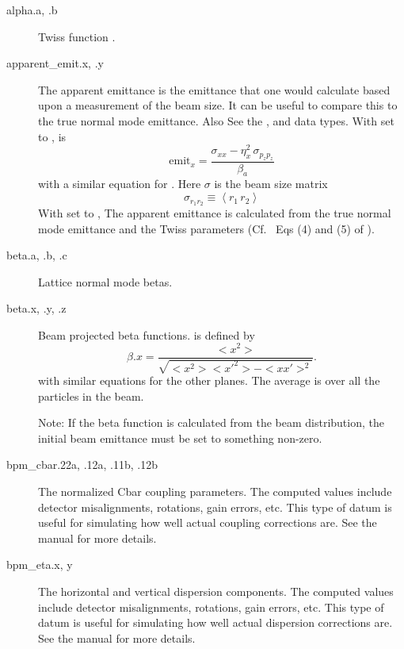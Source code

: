   \begin{description}

  \item[alpha.a, .b] \Newline
Twiss function .

  \item[apparent_emit.x, .y] \Newline
The apparent emittance is the emittance that one would calculate based
upon a measurement of the beam size\cite{b:emit}. It can be useful to
compare this to the true normal mode emittance. Also See the
,  and  data types.
With  set to ,  is
\begin{equation}
  \text{emit}_x = \frac{\sigma_{xx} - \eta_x^2 \, \sigma_{p_zp_z}}{\beta_a}
\end{equation}
with a similar equation for . Here $\sigma$ is the beam size matrix
\begin{equation}
  \sigma_{r_1r_2} \equiv \left< r_1 \, r_2 \right>
\end{equation}
With  set to , The apparent emittance is
calculated from the true normal mode emittance and the Twiss
parameters (Cf.~ Eqs (4) and (5) of \cite{b:emit}).

  \item[beta.a, .b, .c] \Newline
Lattice normal mode betas.

  \item[beta.x, .y, .z] \Newline
Beam projected beta functions.  is defined by
\begin{equation}
  \beta.x = \frac{<x^{2}>}{\sqrt{<x^{2}> <x'^{2}> - <x x'>^{2}}}.
\end{equation}
with similar equations for the other planes.
The average \vn{<>} is over all the particles in the beam.

Note: If the beta function is calculated from the beam distribution,
the initial beam emittance must be set to something non-zero.

  \item[bpm_cbar.22a, .12a, .11b, .12b] \Newline
The normalized Cbar coupling parameters. The computed  values include
detector misalignments, rotations, gain errors, etc. This type of datum is useful for
simulating how well actual coupling corrections are. See the \bmad manual for more
details.

  \item[bpm_eta.x, y] \Newline
The horizontal and vertical dispersion components. The computed  values include
detector misalignments, rotations, gain errors, etc. This type of datum is useful for
simulating how well actual dispersion corrections are. See the \bmad manual for more
details.


\end{description}
